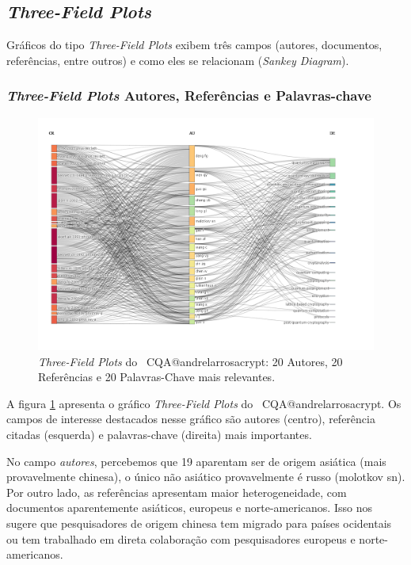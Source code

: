 \subsection{\textit{Three-Field Plots}}

Gráficos do tipo \textit{Three-Field Plots} exibem três campos (autores, documentos, referências, entre outros) e como eles se relacionam (\textit{Sankey Diagram}).

\subsubsection{\textit{Three-Field Plots} Autores, Referências e Palavras-chave}

\begin{figure}
    \centering
    \includegraphics[angle=0,width=1\textwidth]{experiments/andrelarrosacrypt/AnaliseBibliometrica/CriptografiaQuantica/imagens/CQA@andrelarrosacrypt_Aut_Ref_Key.png}
    \caption{\textit{Three-Field Plots} do \dataset\ CQA@andrelarrosacrypt: 20 Autores, 20 Referências e 20 Palavras-Chave mais relevantes.}
    \label{CQA@andrelarrosacrypt_Aut_Ref_Key}
\end{figure}

A figura \ref{CQA@andrelarrosacrypt_Aut_Ref_Key} apresenta o gráfico \textit{Three-Field Plots} do  \dataset\ CQA@andrelarrosacrypt. Os campos de interesse destacados nesse gráfico são autores (centro), referência citadas (esquerda) e palavras-chave (direita) mais importantes.

No campo \textit{autores}, percebemos que 19 aparentam ser de origem asiática (mais provavelmente chinesa), o único não asiático provavelmente é russo (molotkov sn). Por outro lado, as referências apresentam maior heterogeneidade, com documentos aparentemente asiáticos, europeus e norte-americanos. Isso nos sugere que pesquisadores de origem chinesa tem migrado para países ocidentais ou tem trabalhado em direta colaboração com pesquisadores europeus e norte-americanos.


